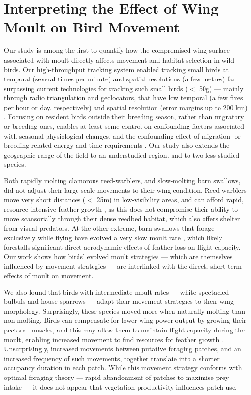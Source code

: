 \section*{Interpreting the Effect of Wing Moult on Bird Movement}

Our study is among the first to quantify how the compromised wing surface associated with moult directly affects movement and habitat selection in wild birds.
Our high-throughput tracking system enabled tracking small birds at temporal (several times per minute) and spatial resolutions (a few metres) far surpassing current technologies for tracking such small birds ($<$ 50g) --- mainly through radio triangulation and geolocators, that have low temporal (a few fixes per hour or day, respectively) and spatial resolution (error margins up to 200 km) \citep{bridge2013}.
Focusing on resident birds outside their breeding season, rather than migratory or breeding ones, enables at least some control on confounding factors associated with seasonal physiological changes, and the confounding effect of migration- or breeding-related energy and time requirements \parencite{alerstam1990,wikelski2003,horvitz2014}.
Our study also extends the geographic range of the field to an understudied region, and to two less-studied species.

Both rapidly molting clamorous reed-warblers, and slow-molting barn swallows, did not adjust their large-scale movements to their wing condition.
Reed-warblers move very short distances ($<$ 25m) in low-visibility areas, and can afford rapid, resource-intensive feather growth \citep{lindstrom1993,newton2009,kiat2017}, as this does not compromise their ability to move scansorially through their dense reedbed habitat, which also offers shelter from visual predators.
At the other extreme, barn swallows that forage exclusively while flying have evolved a very slow moult rate \parencite{kiat2016}, which likely forestalls significant direct aerodynamic effects of feather loss on flight capacity.
Our work shows how birds' evolved moult strategies --- which are themselves influenced by movement strategies \parencite{kiat2016} --- are interlinked with the direct, short-term effects of moult on movement.

We also found that birds with intermediate moult rates --- white-spectacled bulbuls and house sparrows --- adapt their movement strategies to their wing morphology.
Surprisingly, these species moved more when naturally molting than non-molting.
Birds can compensate for lower wing power output by growing their pectoral muscles, and this may allow them to maintain flight capacity during the moult, enabling increased movement to find resources for feather growth \parencite{chai1997,swaddle1997}.
Unsurprisingly, increased movements between putative foraging patches, and an increased frequency of such movements, together translate into a shorter occupancy duration in each patch.
While this movement strategy conforms with optimal foraging theory --- rapid abandonment of patches to maximise prey intake \parencite{charnov1976} --- it does not appear that vegetation productivity influences patch use.

